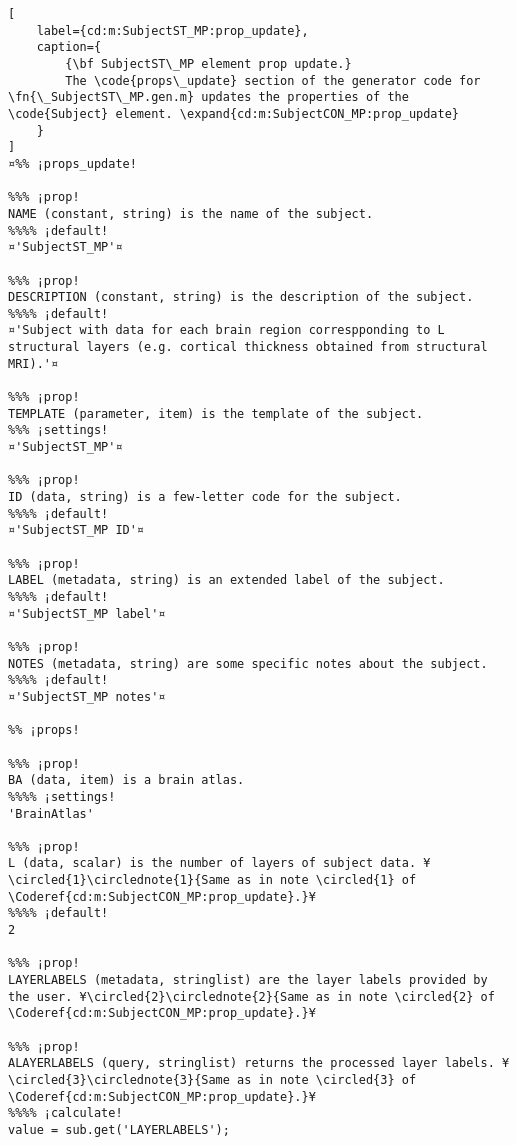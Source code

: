 \documentclass{tufte-handout}
\begin{document}
\begin{lstlisting}[
	label={cd:m:SubjectST_MP:prop_update},
	caption={
		{\bf SubjectST\_MP element prop update.}
		The \code{props\_update} section of the generator code for \fn{\_SubjectST\_MP.gen.m} updates the properties of the \code{Subject} element. \expand{cd:m:SubjectCON_MP:prop_update}
	}
]
¤%% ¡props_update!

%%% ¡prop!
NAME (constant, string) is the name of the subject.
%%%% ¡default!
¤'SubjectST_MP'¤

%%% ¡prop!
DESCRIPTION (constant, string) is the description of the subject.
%%%% ¡default!
¤'Subject with data for each brain region correspponding to L structural layers (e.g. cortical thickness obtained from structural MRI).'¤

%%% ¡prop!
TEMPLATE (parameter, item) is the template of the subject.
%%% ¡settings!
¤'SubjectST_MP'¤

%%% ¡prop!
ID (data, string) is a few-letter code for the subject.
%%%% ¡default!
¤'SubjectST_MP ID'¤

%%% ¡prop!
LABEL (metadata, string) is an extended label of the subject.
%%%% ¡default!
¤'SubjectST_MP label'¤

%%% ¡prop!
NOTES (metadata, string) are some specific notes about the subject.
%%%% ¡default!
¤'SubjectST_MP notes'¤

%% ¡props!

%%% ¡prop!
BA (data, item) is a brain atlas.
%%%% ¡settings!
'BrainAtlas'

%%% ¡prop!
L (data, scalar) is the number of layers of subject data. ¥\circled{1}\circlednote{1}{Same as in note \circled{1} of \Coderef{cd:m:SubjectCON_MP:prop_update}.}¥
%%%% ¡default!
2

%%% ¡prop!
LAYERLABELS (metadata, stringlist) are the layer labels provided by the user. ¥\circled{2}\circlednote{2}{Same as in note \circled{2} of \Coderef{cd:m:SubjectCON_MP:prop_update}.}¥

%%% ¡prop!
ALAYERLABELS (query, stringlist) returns the processed layer labels. ¥\circled{3}\circlednote{3}{Same as in note \circled{3} of \Coderef{cd:m:SubjectCON_MP:prop_update}.}¥
%%%% ¡calculate!
value = sub.get('LAYERLABELS');


\end{lstlisting}
\end{document}
